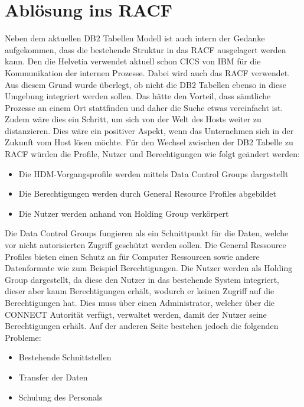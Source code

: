 \section{Ablösung ins RACF}
\label{sec:chapter05:racF}
Neben dem aktuellen DB$2$ Tabellen Modell ist auch intern der Gedanke aufgekommen, dass die bestehende Struktur in das \ac{RACF} ausgelagert werden kann.
Den die Helvetia verwendet aktuell schon \ac{CICS} von IBM für die Kommunikation der internen Prozesse.
Dabei wird auch das \ac{RACF} verwendet.
Aus diesem Grund wurde überlegt, ob nicht die DB$2$ Tabellen ebenso in diese Umgebung integriert werden sollen.
Das hätte den Vorteil, dass sämtliche Prozesse an einem Ort stattfinden und daher die Suche etwas vereinfacht ist.
Zudem wäre dies ein Schritt, um sich von der Welt des Hosts weiter zu distanzieren.
Dies wäre ein positiver Aspekt, wenn das Unternehmen sich in der Zukunft vom Host lösen möchte.
\newline
\newline
Für den Wechsel zwischen der DB2 Tabelle zu \ac{RACF} würden die Profile, Nutzer und Berechtigungen wie folgt geändert werden:
\begin{itemize}
	\item Die HDM-Vorgangsprofile werden mittels Data Control Groups dargestellt
	\item Die Berechtigungen werden durch General Resource Profiles abgebildet
	\item Die Nutzer werden anhand von Holding Group verkörpert
\end{itemize}
Die Data Control Groups fungieren als ein Schnittpunkt für die Daten, welche vor nicht autorisierten Zugriff geschützt werden sollen. \cite{IBMdcg}
Die General Ressource Profiles bieten einen Schutz an für Computer Ressourcen sowie andere Datenformate wie zum Beispiel Berechtigungen. \cite{IBMgrp}
Die Nutzer werden als Holding Group dargestellt, da diese den Nutzer in das bestehende System integriert, dieser aber kaum Berechtigungen erhält, wodurch er keinen Zugriff auf die Berechtigungen hat.
Dies muss über einen Administrator, welcher über die CONNECT Autorität verfügt, verwaltet werden, damit der Nutzer seine Berechtigungen erhält. \cite{IBMhg}
\newline
\newline
Auf der anderen Seite bestehen jedoch die folgenden Probleme:
\begin{itemize}
	\item Bestehende Schnittstellen
	\item Transfer der Daten
	\item Schulung des Personals
\end{itemize}
